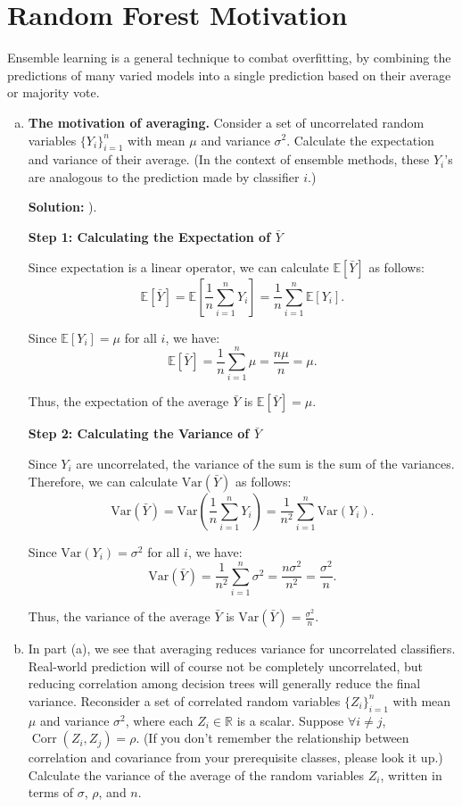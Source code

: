 \documentclass{article}
\newcommand{\Question}[1]{\Large \section{ #1 } \normalsize}
\newenvironment{solution}{\color{blue} \smallskip \textbf{Solution:}}{}
\begin{document}
\newpage
\Question{Random Forest Motivation}
Ensemble learning is a general technique to combat overfitting, by combining the predictions of many varied models into a single prediction based on their average or majority vote.
\begin{enumerate}[(a)]
    \item
    \textbf{The motivation of averaging.} 
    Consider a set of uncorrelated random variables $\{Y_i\}_{i=1}^n$ with mean $\mu$ and variance $\sigma^2$. 
    Calculate the expectation and variance of their average. 
    (In the context of ensemble methods, these $Y_i$'s are analogous to the prediction made by classifier $i$.)

    \begin{solution}
).

\textbf{Step 1: Calculating the Expectation of \(\bar{Y}\)}

Since expectation is a linear operator, we can calculate \(\mathbb{E}[\bar{Y}]\) as follows:
\[
\mathbb{E}[\bar{Y}] = \mathbb{E} \left[ \frac{1}{n} \sum_{i=1}^n Y_i \right] = \frac{1}{n} \sum_{i=1}^n \mathbb{E}[Y_i].
\]

Since \(\mathbb{E}[Y_i] = \mu\) for all \(i\), we have:
\[
\mathbb{E}[\bar{Y}] = \frac{1}{n} \sum_{i=1}^n \mu = \frac{n \mu}{n} = \mu.
\]

Thus, the expectation of the average \(\bar{Y}\) is \(\mathbb{E}[\bar{Y}] = \mu\).


\textbf{Step 2: Calculating the Variance of \(\bar{Y}\)}

Since \(Y_i\) are uncorrelated, the variance of the sum is the sum of the variances. Therefore, we can calculate \(\text{Var}(\bar{Y})\) as follows:
\[
\text{Var}(\bar{Y}) = \text{Var} \left( \frac{1}{n} \sum_{i=1}^n Y_i \right) = \frac{1}{n^2} \sum_{i=1}^n \text{Var}(Y_i).
\]

Since \(\text{Var}(Y_i) = \sigma^2\) for all \(i\), we have:
\[
\text{Var}(\bar{Y}) = \frac{1}{n^2} \sum_{i=1}^n \sigma^2 = \frac{n \sigma^2}{n^2} = \frac{\sigma^2}{n}.
\]

Thus, the variance of the average \(\bar{Y}\) is \(\text{Var}(\bar{Y}) = \frac{\sigma^2}{n}\).





    \end{solution}

    \newpage
    \item
    In part (a), we see that averaging reduces variance for uncorrelated classifiers. 
    Real-world prediction will of course not be completely uncorrelated, but reducing correlation among decision trees will generally reduce the final variance. 
    Reconsider a set of correlated random variables $\{Z_i\}_{i=1}^n$ with mean $\mu$ and variance $\sigma^2$, where each $Z_i \in \mathbb{R}$ is a scalar. 
    Suppose $\forall i \neq j$, $\operatorname{Corr}(Z_i, Z_j) = \rho$. 
    (If you don't remember the relationship between correlation and covariance from your prerequisite classes, please look it up.) 
    Calculate the variance of the average of the random variables $Z_i$, written in terms of $\sigma$, $\rho$, and $n$.


\end{enumerate}
\end{document}
